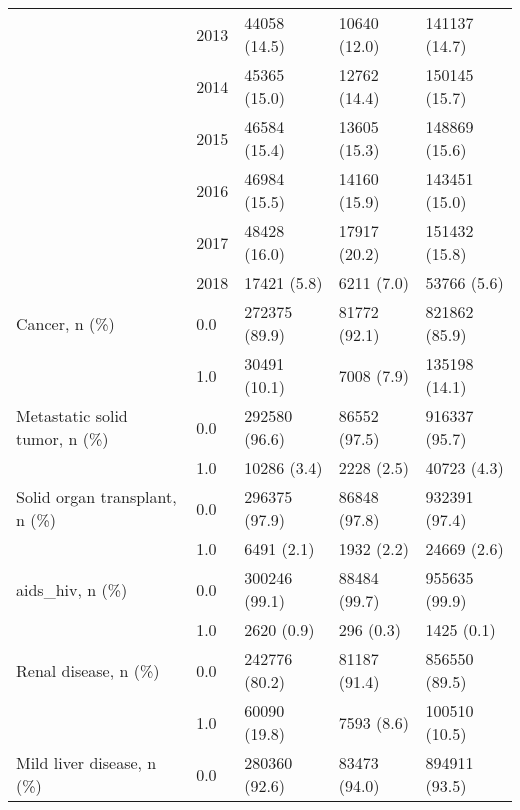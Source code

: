 \begin{tabular}{lllll}
                                       & 2013 &              44058 (14.5) &       10640 (12.0) &      141137 (14.7) \\
                                       & 2014 &              45365 (15.0) &       12762 (14.4) &      150145 (15.7) \\
                                       & 2015 &              46584 (15.4) &       13605 (15.3) &      148869 (15.6) \\
                                       & 2016 &              46984 (15.5) &       14160 (15.9) &      143451 (15.0) \\
                                       & 2017 &              48428 (16.0) &       17917 (20.2) &      151432 (15.8) \\
                                       & 2018 &               17421 (5.8) &         6211 (7.0) &        53766 (5.6) \\
Cancer, n (\%) & 0.0 &             272375 (89.9) &       81772 (92.1) &      821862 (85.9) \\
                                       & 1.0 &              30491 (10.1) &         7008 (7.9) &      135198 (14.1) \\
Metastatic solid tumor, n (\%) & 0.0 &             292580 (96.6) &       86552 (97.5) &      916337 (95.7) \\
                                       & 1.0 &               10286 (3.4) &         2228 (2.5) &        40723 (4.3) \\
Solid organ transplant, n (\%) & 0.0 &             296375 (97.9) &       86848 (97.8) &      932391 (97.4) \\
                                       & 1.0 &                6491 (2.1) &         1932 (2.2) &        24669 (2.6) \\
aids\_hiv, n (\%) & 0.0 &             300246 (99.1) &       88484 (99.7) &      955635 (99.9) \\
                                       & 1.0 &                2620 (0.9) &          296 (0.3) &         1425 (0.1) \\
Renal disease, n (\%) & 0.0 &             242776 (80.2) &       81187 (91.4) &      856550 (89.5) \\
                                       & 1.0 &              60090 (19.8) &         7593 (8.6) &      100510 (10.5) \\
Mild liver disease, n (\%) & 0.0 &             280360 (92.6) &       83473 (94.0) &      894911 (93.5) \\

\end{tabular}
